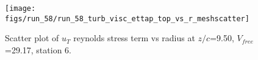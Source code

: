 \begin{figure}[H]
\centering
\texttt{[image: figs/run\_58/run\_58\_turb\_visc\_ettap\_top\_vs\_r\_meshscatter]}
\caption{Scatter plot of $
u_T$ reynolds stress term vs radius at $z/c$=9.50, $V_{free}$=29.17, station 6.}
\end{figure}



